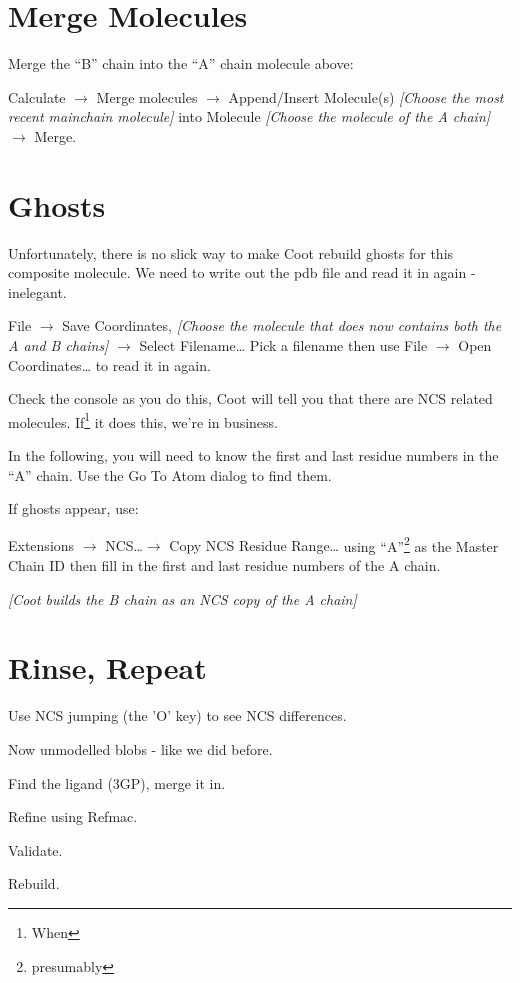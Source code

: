 \documentclass{article}
\begin{document}
\section{Merge Molecules}

Merge the ``B'' chain into the ``A'' chain molecule above: 

\textsf{Calculate $\rightarrow$ Merge molecules $\rightarrow$
  Append/Insert Molecule(s) \emph{[Choose the most recent mainchain
    molecule]} into Molecule \emph{[Choose the molecule of the A chain]}
  $\rightarrow$ Merge}.

\section{Ghosts}

Unfortunately, there is no slick way to make Coot rebuild ghosts for
this composite molecule.  We need to write out the pdb file and read
it in again - inelegant.

\textsf{File $\rightarrow$ Save Coordinates, \emph{[Choose the
    molecule that does now contains both the A and B chains]}
  $\rightarrow$ Select Filename\ldots } Pick a filename then use
\textsf{File $\rightarrow$ Open Coordinates\ldots} to read it in
again.

Check the console as you do this, Coot will tell you that there are
NCS related molecules.  If\footnote{When} it does this, we're in
business.

In the following, you will need to know the first and last residue
numbers in the ``A'' chain.  Use the Go To Atom dialog to find them.

If ghosts appear, use:

\textsf{Extensions $\rightarrow$ NCS\ldots $\rightarrow$ Copy NCS
  Residue Range\ldots} using ``A''\footnote{presumably} as the Master
Chain ID then fill in the first and last residue numbers of the A
chain.

\textsl{[Coot builds the B chain as an NCS copy of the A chain]}

\section{Rinse, Repeat}

\begin{trivlist}
\item  Use NCS jumping (the 'O' key) to see NCS differences.
\item Now unmodelled blobs - like we did before.
\item Find the ligand (3GP), merge it in.
\item Refine using Refmac.
\item Validate. 
\item Rebuild.
\end{trivlist}
\end{document}
